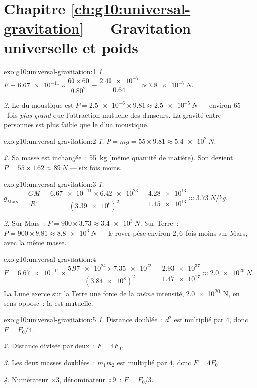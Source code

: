 \section*{Chapitre \ref{ch:g10:universal-gravitation} --- Gravitation universelle et poids}

\begin{solution}{exo:g10:universal-gravitation:1}
\emph{1.} $F = \num{6.67e-11} \times \dfrac{60 \times 60}{0.80^2}
= \dfrac{\num{2.40e-7}}{0.64} \approx \qty{3.8e-7}{N}$.

\emph{2.} Le  du moustique est
$P = \num{2.5e-6} \times 9.81 \approx \qty{2.5e-5}{N}$ --- environ
$65$~fois \emph{plus grand} que l'attraction mutuelle des danseurs.
La gravité entre personnes est plus faible que le  d'un
moustique.
\end{solution}

\begin{solution}{exo:g10:universal-gravitation:2}
\emph{1.} $P = mg = 55 \times 9.81 \approx \qty{5.4e2}{N}$.

\emph{2.} Sa masse est inchangée~: \qty{55}{kg} (même quantité de
matière). Son  devient
$P = 55 \times 1.62 \approx \qty{89}{N}$ --- six fois moins.
\end{solution}

\begin{solution}{exo:g10:universal-gravitation:3}
\emph{1.} $g_{\text{Mars}} = \dfrac{G M}{R^2}
= \dfrac{\num{6.67e-11} \times \num{6.42e23}}{(\num{3.39e6})^2}
= \dfrac{\num{4.28e13}}{\num{1.15e13}} \approx \qty{3.73}{N/kg}$.

\emph{2.} Sur Mars~: $P = 900 \times 3.73 \approx \qty{3.4e3}{N}$. Sur
Terre~: $P = 900 \times 9.81 \approx \qty{8.8e3}{N}$ --- le rover
pèse environ $2{,}6$~fois moins sur Mars, avec la même masse.
\end{solution}

\begin{solution}{exo:g10:universal-gravitation:4}
\[
F = \num{6.67e-11} \times
\frac{\num{5.97e24} \times \num{7.35e22}}{(\num{3.84e8})^2}
= \frac{\num{2.93e37}}{\num{1.47e17}}
\approx \qty{2.0e20}{N}.
\]
La Lune exerce sur la Terre une force de la \emph{même} intensité,
\qty{2.0e20}{N}, en sens opposé~: la  est mutuelle.
\end{solution}

\begin{solution}{exo:g10:universal-gravitation:5}
\emph{1.} Distance doublée~: $d^2$ est multiplié par $4$, donc
$F = F_0/4$.

\emph{2.} Distance divisée par deux~: $F = 4F_0$.

\emph{3.} Les deux masses doublées~: $m_1 m_2$ est multiplié par $4$,
donc $F = 4F_0$.

\emph{4.} Numérateur $\times 3$, dénominateur $\times 9$~:
$F = F_0/3$.
\end{solution}


